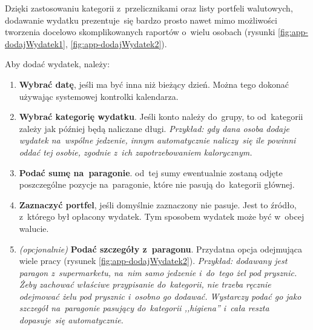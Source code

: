 \documentclass[12pt,a4paper,twoside,titlepage,openright]{book}
\begin{document}
Dzięki zastosowaniu kategorii z~przelicznikami oraz listy portfeli walutowych, dodawanie wydatku prezentuje~się bardzo prosto nawet mimo możliwości tworzenia docelowo skomplikowanych raportów o~wielu osobach (rysunki \ref{fig:app-dodajWydatek1}, \ref{fig:app-dodajWydatek2}).

Aby dodać wydatek, należy:

\begin{enumerate}
\item \textbf{Wybrać datę}, jeśli ma być inna niż bieżący dzień. Można tego dokonać używając systemowej kontrolki kalendarza.
\item \textbf{Wybrać kategorię wydatku}. Jeśli konto należy do~grupy, to od~kategorii zależy jak później będą naliczane długi. \textit{Przykład: gdy dana osoba dodaje wydatek na~wspólne jedzenie, innym automatycznie naliczy~się ile powinni oddać tej osobie, zgodnie z~ich zapotrzebowaniem kalorycznym.}
\item \textbf{Podać sumę na~paragonie}. od~tej sumy ewentualnie zostaną odjęte poszczególne pozycje na~paragonie, które nie pasują do~kategorii głównej.
\item \textbf{Zaznaczyć portfel}, jeśli domyślnie zaznaczony nie pasuje. Jest to źródło, z~którego był opłacony wydatek. Tym sposobem wydatek może być w~obcej walucie.
\item \textit{(opcjonalnie)} \textbf{Podać szczegóły z~paragonu}. Przydatna opcja odejmująca wiele pracy (rysunek \ref{fig:app-dodajWydatek2}). \textit{Przykład: dodawany jest paragon z~supermarketu, na~nim samo jedzenie i~do~tego żel pod prysznic. Żeby zachować właściwe przypisanie do~kategorii, nie trzeba ręcznie odejmować żelu pod prysznic i~osobno go dodawać. Wystarczy podać go jako szczegół na~paragonie pasujący do~kategorii ,,higiena'' i~cała reszta dopasuje~się automatycznie.}
\end{enumerate}
\end{document}
